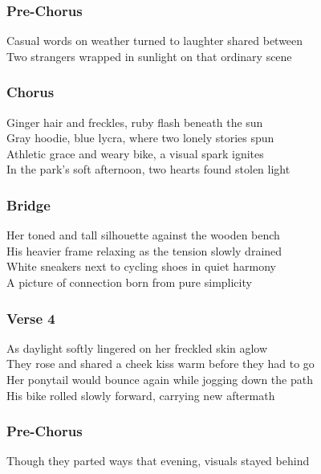 \subsubsection{Pre-Chorus}\label{pre-chorus-53}

Casual words on weather turned to laughter shared between\\
Two strangers wrapped in sunlight on that ordinary scene

\subsubsection{Chorus}\label{chorus-76}

Ginger hair and freckles, ruby flash beneath the sun\\
Gray hoodie, blue lycra, where two lonely stories spun\\
Athletic grace and weary bike, a visual spark ignites\\
In the park's soft afternoon, two hearts found stolen light

\subsubsection{Bridge}\label{bridge-27}

Her toned and tall silhouette against the wooden bench\\
His heavier frame relaxing as the tension slowly drained\\
White sneakers next to cycling shoes in quiet harmony\\
A picture of connection born from pure simplicity

\subsubsection{Verse 4}\label{verse-4-8}

As daylight softly lingered on her freckled skin aglow\\
They rose and shared a cheek kiss warm before they had to go\\
Her ponytail would bounce again while jogging down the path\\
His bike rolled slowly forward, carrying new aftermath

\subsubsection{Pre-Chorus}\label{pre-chorus-54}

Though they parted ways that evening, visuals stayed behind


